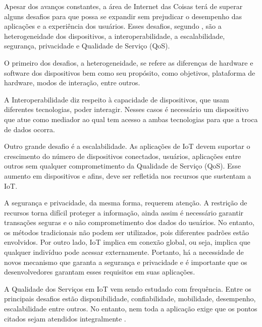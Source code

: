 Apesar dos avanços constantes, a área de Internet das Coisas terá de superar alguns desafios para que possa se expandir sem prejudicar o desempenho das aplicações e a experiência dos usuários. Esses desafios, segundo , são a heterogeneidade dos dispositivos, a interoperabilidade, a escalabilidade, segurança, privacidade e Qualidade de Serviço (QoS).

O primeiro dos desafios, a heterogeneidade, se refere as diferenças de hardware e software dos dispositivos bem como seu propósito, como objetivos, plataforma de hardware, modos de interação, entre outros. %

A Interoperabilidade diz respeito à capacidade de dispositivos, que usam diferentes tecnologias, poder interagir. Nesses casos é necessário um dispositivo que atue como mediador ao qual tem acesso a ambas tecnologias para que a troca de dados ocorra.

Outro grande desafio é a escalabilidade. As aplicações de IoT devem suportar o crescimento do número de dispositivos conectados, usuários, aplicações entre outros sem qualquer comprometimento da Qualidade de Serviço (QoS). Esse aumento em dispositivos e afins, deve ser refletida nos recursos que sustentam a IoT. 

A segurança e privacidade, da mesma forma, requerem atenção. A restrição de recursos torna difícil proteger a informação, ainda assim é necessário garantir transações seguras e o não comprometimento dos dados do usuários. No entanto, os métodos tradicionais não podem ser utilizados, pois diferentes padrões estão envolvidos. Por outro lado, IoT implica em conexão global, ou seja, implica que qualquer indivíduo pode acessar externamente. 
Portanto, há a necessidade de novos mecanismo que garanta a segurança e privacidade e é importante que os desenvolvedores garantam esses requisitos em suas aplicações. 


A Qualidade dos Serviços em IoT vem sendo estudado com frequência. Entre os principais desafios estão disponibilidade, confiabilidade, mobilidade, desempenho, escalabilidade entre outros. No entanto, nem toda a aplicação exige que os pontos citados sejam atendidos integralmente \cite{Hussain2016}. 